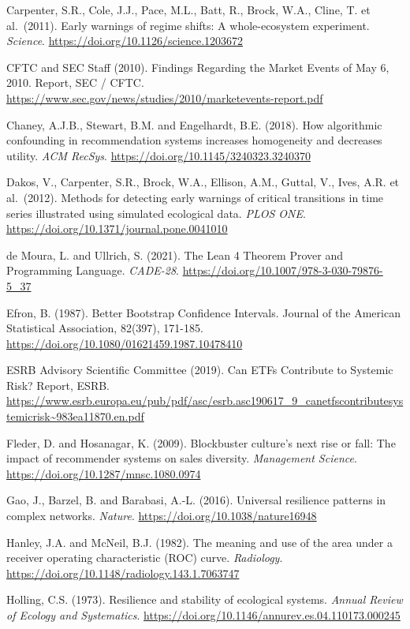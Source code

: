 \documentclass[
  11pt,
]{article}
\begin{document}
Carpenter, S.R., Cole, J.J., Pace, M.L., Batt, R., Brock, W.A., Cline,
T. et al.~(2011). Early warnings of regime shifts: A whole-ecosystem
experiment. \emph{Science}.
\url{https://doi.org/10.1126/science.1203672}

CFTC and SEC Staff (2010). Findings Regarding the Market Events of May
6, 2010. Report, SEC / CFTC.
\url{https://www.sec.gov/news/studies/2010/marketevents-report.pdf}

Chaney, A.J.B., Stewart, B.M. and Engelhardt, B.E. (2018). How
algorithmic confounding in recommendation systems increases homogeneity
and decreases utility. \emph{ACM RecSys}.
\url{https://doi.org/10.1145/3240323.3240370}

Dakos, V., Carpenter, S.R., Brock, W.A., Ellison, A.M., Guttal, V.,
Ives, A.R. et al.~(2012). Methods for detecting early warnings of
critical transitions in time series illustrated using simulated
ecological data. \emph{PLOS ONE}.
\url{https://doi.org/10.1371/journal.pone.0041010}

de Moura, L. and Ullrich, S. (2021). The Lean 4 Theorem Prover and
Programming Language. \emph{CADE-28}.
\url{https://doi.org/10.1007/978-3-030-79876-5_37}

Efron, B. (1987). Better Bootstrap Confidence Intervals. Journal of the
American Statistical Association, 82(397), 171-185.
\url{https://doi.org/10.1080/01621459.1987.10478410}

ESRB Advisory Scientific Committee (2019). Can ETFs Contribute to
Systemic Risk? Report, ESRB.
\url{https://www.esrb.europa.eu/pub/pdf/asc/esrb.asc190617_9_canetfscontributesystemicrisk~983ea11870.en.pdf}

Fleder, D. and Hosanagar, K. (2009). Blockbuster culture's next rise or
fall: The impact of recommender systems on sales diversity.
\emph{Management Science}. \url{https://doi.org/10.1287/mnsc.1080.0974}

Gao, J., Barzel, B. and Barabasi, A.-L. (2016). Universal resilience
patterns in complex networks. \emph{Nature}.
\url{https://doi.org/10.1038/nature16948}

Hanley, J.A. and McNeil, B.J. (1982). The meaning and use of the area
under a receiver operating characteristic (ROC) curve. \emph{Radiology}.
\url{https://doi.org/10.1148/radiology.143.1.7063747}

Holling, C.S. (1973). Resilience and stability of ecological systems.
\emph{Annual Review of Ecology and Systematics}.
\url{https://doi.org/10.1146/annurev.es.04.110173.000245}
\end{document}

